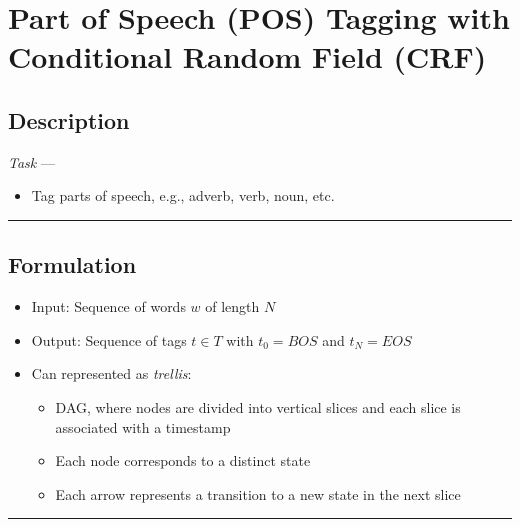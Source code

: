 \section{Part of Speech (POS) Tagging with Conditional Random Field (CRF)}
\subsection*{Description}
\emph{Task} --- 
\begin{itemize}
    \item Tag parts of speech, e.g., adverb, verb, noun, etc.
\end{itemize}

{\color{black}\hrule height 0.001mm}

\subsection*{Formulation}
\begin{itemize}
    \item Input: Sequence of words $w$ of length $N$
    \item Output: Sequence of tags $t \in T$ with $t_0 = BOS$ and $t_N = EOS$
    \item Can represented as \emph{trellis}:
    \begin{itemize}
        \item DAG, where nodes are divided into vertical slices and each slice is associated with a timestamp
        \item Each node corresponds to a distinct state
        \item Each arrow represents a transition to a new state in the next slice
    \end{itemize}
\end{itemize}

{\color{lightgray}\hrule height 0.001mm}


